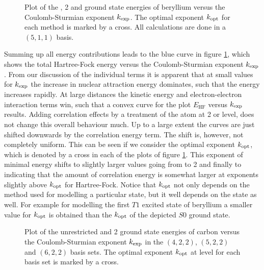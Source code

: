 \begin{figure}
	\centering
	\caption[
		Plot of the \HF, {\MP}2 and \FCI energies
		versus the \CS exponent $\kexp$
	]{
		Plot of the \HF, {\MP}2 and \FCI ground state energies
		of beryllium
		versus the Coulomb-Sturmian exponent $\kexp$.
		The optimal exponent $k_\text{opt}$ for each
		method is marked by a cross.
		All calculations are done in a $(5,1,1)$ \CS basis.
	}
	\label{fig:FCI_vs_k}
\end{figure}
Summing up all energy contributions leads to the blue curve
in figure \ref{fig:FCI_vs_k},
which shows the total Hartree-Fock energy versus
the Coulomb-Sturmian exponent $\kexp$.
From our discussion of the individual terms
it is apparent that at small values for $\kexp$
the increase in nuclear attraction energy dominates,
such that the \HF energy increases rapidly.
At large distances the kinetic energy and electron-electron
interaction terms win, such that a convex curve
for the plot $E_\text{HF}$ versus $\kexp$ results.
Adding correlation effects by a treatment of the atom at {\MP}2 or \FCI level,
does not change this overall behaviour much.
Up to a large extent the curves are just shifted downwards by the
correlation energy term.
The shift is, however, not completely uniform.
This can be seen if we consider the optimal \CS exponent $k_\text{opt}$,
which is denoted by a cross in each of the plots of figure \ref{fig:FCI_vs_k}.
This exponent of minimal energy shifts
to slightly larger values going from \HF to {\MP}2 and finally to \FCI
indicating that the amount of correlation energy is somewhat larger
at exponents slightly above $k_\text{opt}$ for Hartree-Fock.
Notice that $k_\text{opt}$ not only depends on the method used for modelling
a particular state,
but it well depends on the state as well.
For example for modelling the first $T1$ excited state of beryllium
a smaller value for $k_\text{opt}$ is obtained than the \FCI $k_\text{opt}$
of the depicted $S0$ ground state.

\begin{figure}
	\centering
	\caption[
		Dependency of the \HF and {\MP}2 energies
		on the \CS basis set parameters
	]{
		Plot of the unrestricted
		\HF and {\MP}2 ground state energies of carbon
		versus the Coulomb-Sturmian exponent $\kexp$
		in the $(4,2,2)$, $(5,2,2)$ and $(6,2,2)$ basis sets.
		The optimal exponent $k_\text{opt}$ at \HF level
		for each basis set is marked by a cross.
	}
	\label{fig:EHF_vs_k}
\end{figure}

